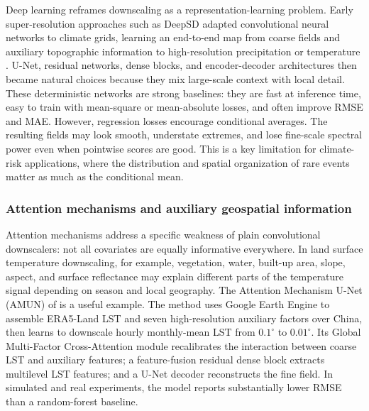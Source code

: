 \documentclass[a4paper,12pt,leqno]{article}
\begin{document}
Deep learning reframes downscaling as a representation-learning problem.
Early super-resolution approaches such as DeepSD adapted convolutional
neural networks to climate grids, learning an end-to-end map from coarse
fields and auxiliary topographic information to high-resolution
precipitation or temperature \parencite{vandal2017deepsd}. U-Net,
residual networks, dense blocks, and encoder-decoder architectures then
became natural choices because they mix large-scale context with local
detail. These deterministic networks are strong baselines: they are fast
at inference time, easy to train with mean-square or mean-absolute
losses, and often improve RMSE and MAE. However, regression losses
encourage conditional averages. The resulting fields may look smooth,
understate extremes, and lose fine-scale spectral power even when
pointwise scores are good. This is a key limitation for climate-risk
applications, where the distribution and spatial organization of rare
events matter as much as the conditional mean.

\subsubsection{Attention mechanisms and auxiliary geospatial information}

Attention mechanisms address a specific weakness of plain convolutional
downscalers: not all covariates are equally informative everywhere. In
land surface temperature downscaling, for example, vegetation, water,
built-up area, slope, aspect, and surface reflectance may explain
different parts of the temperature signal depending on season and local
geography. The Attention Mechanism U-Net (AMUN) of
\textcite{li2025attention_downscaling} is a useful example. The method
uses Google Earth Engine to assemble ERA5-Land LST and seven
high-resolution auxiliary factors over China, then learns to downscale
hourly monthly-mean LST from \(0.1^\circ\) to \(0.01^\circ\). Its Global
Multi-Factor Cross-Attention module recalibrates the interaction between
coarse LST and auxiliary features; a feature-fusion residual dense block
extracts multilevel LST features; and a U-Net decoder reconstructs the
fine field. In simulated and real experiments, the model reports
substantially lower RMSE than a random-forest baseline.
\end{document}
